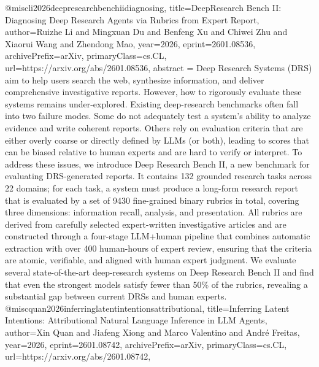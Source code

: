 {}@misc{li2026deepresearchbenchiidiagnosing,
      title={DeepResearch Bench II: Diagnosing Deep Research Agents via Rubrics from Expert Report}, 
      author={Ruizhe Li and Mingxuan Du and Benfeng Xu and Chiwei Zhu and Xiaorui Wang and Zhendong Mao},
      year={2026},
      eprint={2601.08536},
      archivePrefix={arXiv},
      primaryClass={cs.CL},
      url={https://arxiv.org/abs/2601.08536},
      abstract = {Deep Research Systems (DRS) aim to help users search the web, synthesize information, and deliver comprehensive investigative reports. However, how to rigorously evaluate these systems remains under-explored. Existing deep-research benchmarks often fall into two failure modes. Some do not adequately test a system's ability to analyze evidence and write coherent reports. Others rely on evaluation criteria that are either overly coarse or directly defined by LLMs (or both), leading to scores that can be biased relative to human experts and are hard to verify or interpret. To address these issues, we introduce Deep Research Bench II, a new benchmark for evaluating DRS-generated reports. It contains 132 grounded research tasks across 22 domains; for each task, a system must produce a long-form research report that is evaluated by a set of 9430 fine-grained binary rubrics in total, covering three dimensions: information recall, analysis, and presentation. All rubrics are derived from carefully selected expert-written investigative articles and are constructed through a four-stage LLM+human pipeline that combines automatic extraction with over 400 human-hours of expert review, ensuring that the criteria are atomic, verifiable, and aligned with human expert judgment. We evaluate several state-of-the-art deep-research systems on Deep Research Bench II and find that even the strongest models satisfy fewer than 50\% of the rubrics, revealing a substantial gap between current DRSs and human experts.}
}@misc{quan2026inferringlatentintentionsattributional,
      title={Inferring Latent Intentions: Attributional Natural Language Inference in LLM Agents}, 
      author={Xin Quan and Jiafeng Xiong and Marco Valentino and André Freitas},
      year={2026},
      eprint={2601.08742},
      archivePrefix={arXiv},
      primaryClass={cs.CL},
      url={https://arxiv.org/abs/2601.08742},
}

